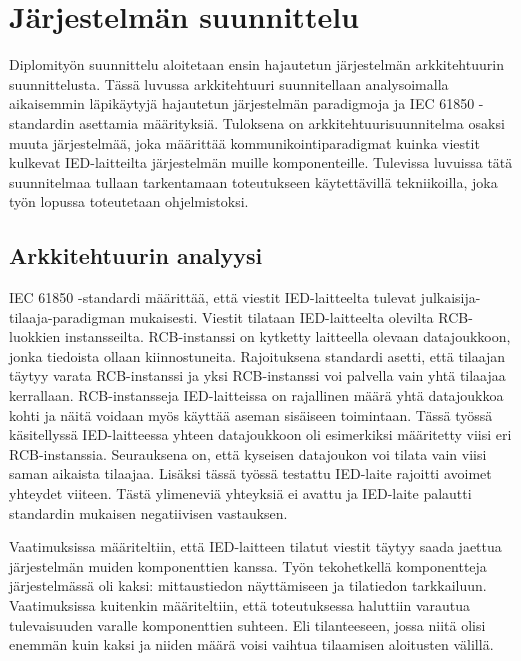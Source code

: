 \chapter{Järjestelmän suunnittelu}
Diplomityön suunnittelu aloitetaan ensin hajautetun järjestelmän arkkitehtuurin suunnittelusta. Tässä luvussa arkkitehtuuri suunnitellaan analysoimalla aikaisemmin läpikäytyjä hajautetun järjestelmän paradigmoja ja IEC 61850 -standardin asettamia määrityksiä. Tuloksena on arkkitehtuurisuunnitelma osaksi muuta järjestelmää, joka määrittää kommunikointiparadigmat kuinka viestit kulkevat IED-laitteilta järjestelmän muille komponenteille. Tulevissa luvuissa tätä suunnitelmaa tullaan tarkentamaan toteutukseen käytettävillä tekniikoilla, joka työn lopussa toteutetaan ohjelmistoksi.


\section{Arkkitehtuurin analyysi}
\label{ch:architecture-analysis}
IEC 61850 -standardi määrittää, että viestit IED-laitteelta tulevat julkaisija-tilaaja-pa\-ra\-dig\-man mukaisesti. Viestit tilataan IED-laitteelta olevilta RCB-luokkien instansseilta. RCB-instanssi on kytketty laitteella olevaan datajoukkoon, jonka tiedoista ollaan kiinnostuneita. Rajoituksena standardi asetti, että tilaajan täytyy varata RCB-instanssi ja yksi RCB-instanssi voi palvella vain yhtä tilaajaa kerrallaan. RCB-instansseja IED-laitteissa on rajallinen määrä yhtä datajoukkoa kohti ja näitä voidaan myös käyttää aseman sisäiseen toimintaan. Tässä työssä käsitellyssä IED-laitteessa yhteen datajoukkoon oli esimerkiksi määritetty viisi eri RCB-instanssia. Seurauksena on, että kyseisen datajoukon voi tilata vain viisi saman aikaista tilaajaa. Lisäksi tässä työssä testattu IED-laite rajoitti avoimet yhteydet viiteen. Tästä ylimeneviä yhteyksiä ei avattu ja IED-laite palautti standardin mukaisen negatiivisen vastauksen.

Vaatimuksissa määriteltiin, että IED-laitteen tilatut viestit täytyy saada jaettua järjestelmän muiden komponenttien kanssa. Työn tekohetkellä komponentteja järjestelmässä oli kaksi: mittaustiedon näyttämiseen ja tilatiedon tarkkailuun. Vaatimuksissa kuitenkin määriteltiin, että toteutuksessa haluttiin varautua tulevaisuuden varalle komponenttien suhteen. Eli tilanteeseen, jossa niitä olisi enemmän kuin kaksi ja niiden määrä voisi vaihtua tilaamisen aloitusten välillä.

